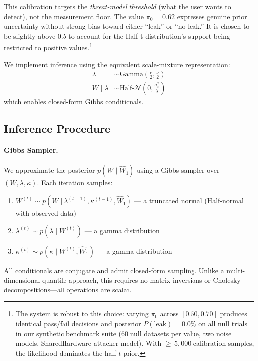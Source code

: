 \documentclass[letterpaper,twocolumn,10pt]{article}
\begin{document}
This calibration targets the \emph{threat-model threshold} (what the user wants to detect),
not the measurement floor. The value $\pi_0 = 0.62$ expresses genuine prior uncertainty
without strong bias toward either ``leak'' or ``no leak.'' It is chosen to be slightly above
0.5 to account for the Half-t distribution's support being restricted to positive values.\footnote{The system is robust to this choice: varying $\pi_0$ across $[0.50, 0.70]$ produces identical pass/fail decisions and posterior $P(\text{leak}) = 0.0\%$ on all null trials in our synthetic benchmark suite (60 null datasets per value, two noise models, SharedHardware attacker model). With ${\geq}\,5{,}000$ calibration samples, the likelihood dominates the half-$t$ prior.}

We implement inference using the equivalent scale-mixture representation:
\begin{align}
\lambda &\sim \text{Gamma}\!\left(\frac{\nu}{2}, \frac{\nu}{2}\right) \\
W \mid \lambda &\sim \text{Half-}\mathcal{N}\!\left(0, \frac{\sigma_t^2}{\lambda}\right)
\end{align}
which enables closed-form Gibbs conditionals.

\subsection{Inference Procedure}
\label{app:inference}

\paragraph{Gibbs Sampler.}
We approximate the posterior $p(W \mid \widehat{W}_1)$ using a Gibbs sampler over $(W, \lambda, \kappa)$.
Each iteration samples:
\begin{enumerate}
\item $W^{(t)} \sim p(W \mid \lambda^{(t-1)}, \kappa^{(t-1)}, \widehat{W}_1)$ --- a truncated normal (Half-normal with observed data)
\item $\lambda^{(t)} \sim p(\lambda \mid W^{(t)})$ --- a gamma distribution
\item $\kappa^{(t)} \sim p(\kappa \mid W^{(t)}, \widehat{W}_1)$ --- a gamma distribution
\end{enumerate}

All conditionals are conjugate and admit closed-form sampling. Unlike a multi-dimensional quantile
approach, this requires no matrix inversions or Cholesky decompositions---all operations
are scalar.
\end{document}
